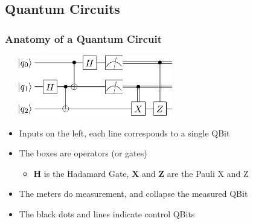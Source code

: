 \documentclass{beamer}
\newcommand{\hop}{\textbf{H}}
\newcommand{\xop}{\textbf{X}}
\newcommand{\zop}{\textbf{Z}}
\begin{document}
  \subsection{Quantum Circuits}
  \begin{frame}
    \frametitle{Anatomy of a Quantum Circuit}
    \includegraphics[height=100px,width=300px]{circuit.png}
    \begin{itemize}
      \item{Inputs on the left, each line corresponds to a single QBit}
      \item{The boxes are operators (or gates)}
      \begin{itemize}
        \item{$\hop$ is the Hadamard Gate, $\xop$ and $\zop$ are the Pauli X and Z}
      \end{itemize}
      \item{The meters do measurement, and collapse the measured QBit}
      \item{The black dots and lines indicate control QBits}
    \end{itemize}
  \end{frame}
\end{document}
